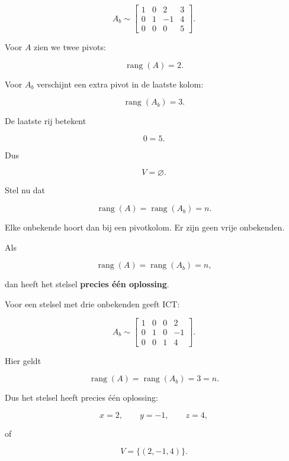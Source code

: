 \documentclass{ximera}
\begin{document}
\begin{voorbeeld}

\[
A_b\sim
\left[
\begin{array}{ccc|c}
1&0&2&3\\
0&1&-1&4\\
0&0&0&5
\end{array}
\right].
\]

Voor \(A\) zien we twee pivots:

\[
\operatorname{rang}(A)=2.
\]

Voor \(A_b\) verschijnt een extra pivot in de laatste kolom:

\[
\operatorname{rang}(A_b)=3.
\]

De laatste rij betekent

\[
0=5.
\]

Dus

\[
V=\varnothing.
\]

\end{voorbeeld}




Stel nu dat

\[
\operatorname{rang}(A)=\operatorname{rang}(A_b)=n.
\]

Elke onbekende hoort dan bij een pivotkolom.
Er zijn geen vrije onbekenden.

\begin{eigenschap}
Als

\[
\operatorname{rang}(A)
=
\operatorname{rang}(A_b)
=
n,
\]

dan heeft het stelsel \textbf{precies één oplossing}.
\end{eigenschap}


\begin{voorbeeld}

Voor een stelsel met drie onbekenden geeft ICT:

\[
A_b\sim
\left[
\begin{array}{ccc|c}
1&0&0&2\\
0&1&0&-1\\
0&0&1&4
\end{array}
\right].
\]

Hier geldt

\[
\operatorname{rang}(A)
=
\operatorname{rang}(A_b)
=
3=n.
\]

Dus het stelsel heeft precies één oplossing:

\[
x=2,\qquad y=-1,\qquad z=4,
\]

of

\[
V=\{(2,-1,4)\}.
\]

\end{voorbeeld}
\end{document}
